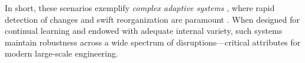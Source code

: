 In short, these scenarios exemplify \textit{complex adaptive systems} \cite{holland1975, millerpage2007}, where rapid detection of changes and swift reorganization are paramount \cite{gleick1987, arthur1994}. When designed for continual learning and endowed with adequate internal variety, such systems maintain robustness across a wide spectrum of disruptions—critical attributes for modern large-scale engineering.